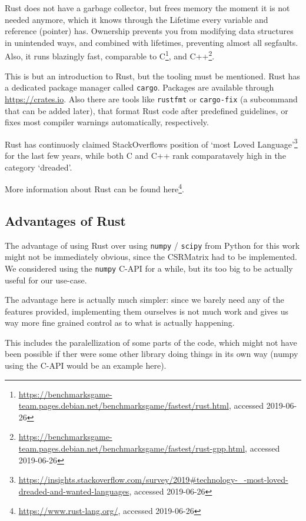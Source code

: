 Rust does not have a garbage collector, but frees memory the moment it is not
needed anymore, which it knows through the Lifetime every variable and
reference (pointer) has. Ownership prevents you from modifying data structures
in unintended ways, and combined with lifetimes, preventing almost all
segfaults. Also, it runs blazingly fast, comparable to
C\footnote{\url{https://benchmarksgame-team.pages.debian.net/benchmarksgame/fastest/rust.html},
accessed 2019-06-26}, and
C++\footnote{\url{https://benchmarksgame-team.pages.debian.net/benchmarksgame/fastest/rust-gpp.html},
accessed 2019-06-26}.

This is but an introduction to Rust, but the tooling must be mentioned. Rust
has a dedicated package manager called \verb|cargo|. Packages are available
through \url{https://crates.io}. Also there are tools like \verb|rustfmt| or
\verb|cargo-fix| (a subcommand that can be added later), that format Rust code
after predefined guidelines, or fixes most compiler warnings automatically,
respectively.

Rust has continuosly claimed StackOverflows position of `most Loved
Language'\footnote{\url{https://insights.stackoverflow.com/survey/2019\#technology-\_-most-loved-dreaded-and-wanted-languages}, accessed 2019-06-26}
for the last few years, while both C and C++ rank comparatavely high in the
category `dreaded'.

More information about Rust can be found here\footnote{\url{https://www.rust-lang.org/}, accessed 2019-06-26}.


\subsection{Advantages of Rust}

The advantage of using Rust over using \verb|numpy| / \verb|scipy| from Python
for this work might not be immediately obvious, since the CSRMatrix had to be
implemented. We considered using the \verb|numpy| C-API for a while, but its
too big to be actually useful for our use-case.

The advantage here is actually much simpler: since we barely need any of the
features provided, implementing them ourselves is not much work and gives us
way more fine grained control as to what is actually happening.

This includes the paralellization of some parts of the code, which might not
have been possible if ther were some other library doing things in its own way
(numpy using the C-API would be an example here).

